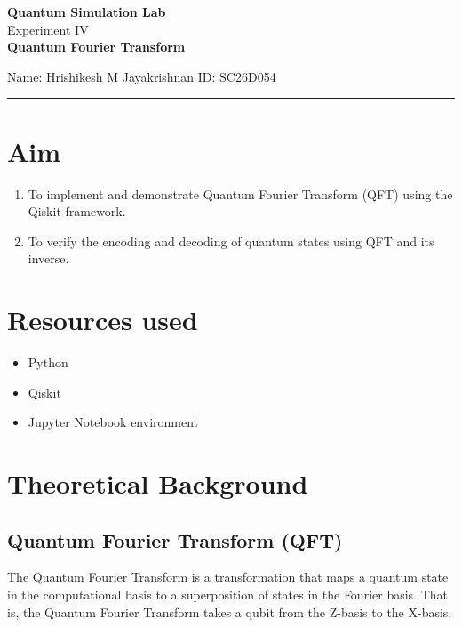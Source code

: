 \documentclass[12pt]{article}
\begin{document}
\begin{center}
    {\Large \textbf{Quantum Simulation Lab}} \\
    \vspace{0.8cm}
    {\Large Experiment IV} \\
    \vspace{0.2cm}
    {\Large \textbf{Quantum Fourier Transform}} \\
\end{center}

\vspace{0.5cm}
\noindent Name: Hrishikesh M Jayakrishnan \hfill ID: SC26D054
\vspace{1em}
\hrule

\vspace{1em}
\section{Aim}
\begin{enumerate}
    \item To implement and demonstrate Quantum Fourier Transform (QFT) using the Qiskit framework.
    \item To verify the encoding and decoding of quantum states using QFT and its inverse.
\end{enumerate}

\section{Resources used}
\begin{itemize}
    \item Python
    \item Qiskit 
    \item Jupyter Notebook environment
\end{itemize}

\section{Theoretical Background}
\subsection{Quantum Fourier Transform (QFT)}
The Quantum Fourier Transform is a transformation that maps a quantum state in the computational basis to a superposition of states in the Fourier basis. That is, the Quantum Fourier Transform takes a qubit from the Z-basis to the X-basis. 
\newpage
\end{document}
